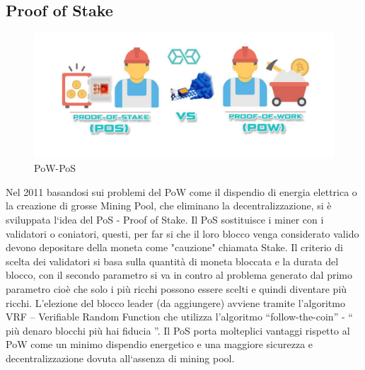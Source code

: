 \documentclass[11pt,a4paper,titlepage, twoside, openright]{report}
\begin{document}
\subsection{Proof of Stake}
\begin{figure}[h]
	\includegraphics[width=\textwidth]{pow-pos}
	\centering
	\caption{PoW-PoS}
	\label{fig:pow-pos}
\end{figure}

Nel 2011 basandosi sui problemi del PoW come il dispendio di energia elettrica o la creazione di grosse Mining Pool, che eliminano la decentralizzazione, si è sviluppata l`idea del PoS - Proof of Stake. Il PoS sostituisce i miner con i validatori o coniatori, questi, per far si che il loro blocco venga considerato valido devono depositare della moneta come "cauzione" chiamata Stake.
Il criterio di scelta dei validatori si basa sulla quantità di moneta bloccata e la durata del blocco, con il secondo parametro si va in contro al problema generato dal primo parametro cioè che solo i più ricchi possono essere scelti e quindi diventare più ricchi.
L'elezione del blocco leader (da aggiungere) avviene tramite l'algoritmo VRF – Verifiable Random Function che utilizza l'algoritmo “follow-the-coin” - “ più denaro blocchi più hai fiducia ”. Il PoS porta molteplici vantaggi rispetto al PoW come un minimo dispendio energetico e una maggiore sicurezza e decentralizzazione dovuta all`assenza di mining pool.
\end{document}
